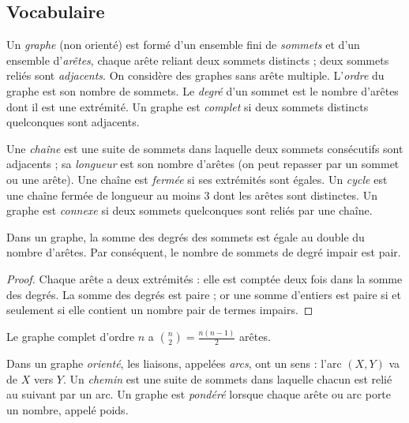 \subsection{Vocabulaire}
\begin{definition}[Graphe]
Un \emph{graphe} (non orienté) est formé d'un ensemble fini de \emph{sommets} et d'un ensemble d'\emph{arêtes}, chaque arête reliant deux sommets distincts ; deux sommets reliés sont \emph{adjacents}. On considère des graphes sans arête multiple. L'\emph{ordre} du graphe est son nombre de sommets. Le \emph{degré} d'un sommet est le nombre d'arêtes dont il est une extrémité. Un graphe est \emph{complet} si deux sommets distincts quelconques sont adjacents.
\end{definition}
\begin{definition}
Une \emph{chaîne} est une suite de sommets dans laquelle deux sommets consécutifs sont adjacents ; sa \emph{longueur} est son nombre d'arêtes (on peut repasser par un sommet ou une arête). Une chaîne est \emph{fermée} si ses extrémités sont égales. Un \emph{cycle} est une chaîne fermée de longueur au moins $3$ dont les arêtes sont distinctes. Un graphe est \emph{connexe} si deux sommets quelconques sont reliés par une chaîne.
\end{definition}
\begin{figurebox}
\end{figurebox}
\begin{theorem}
Dans un graphe, la somme des degrés des sommets est égale au double du nombre d'arêtes. Par conséquent, le nombre de sommets de degré impair est pair.
\end{theorem}
\begin{proof}
Chaque arête a deux extrémités : elle est comptée deux fois dans la somme des degrés. La somme des degrés est paire ; or une somme d'entiers est paire si et seulement si elle contient un nombre pair de termes impairs.
\end{proof}
\begin{theorem}
Le graphe complet d'ordre $n$ a $\binom n2=\frac{n(n-1)}2$ arêtes.
\end{theorem}
\begin{definition}
Dans un graphe \emph{orienté}, les liaisons, appelées \emph{arcs}, ont un sens : l'arc $(X,Y)$ va de $X$ vers $Y$. Un \emph{chemin} est une suite de sommets dans laquelle chacun est relié au suivant par un arc. Un graphe est \emph{pondéré} lorsque chaque arête ou arc porte un nombre, appelé poids.
\end{definition}

